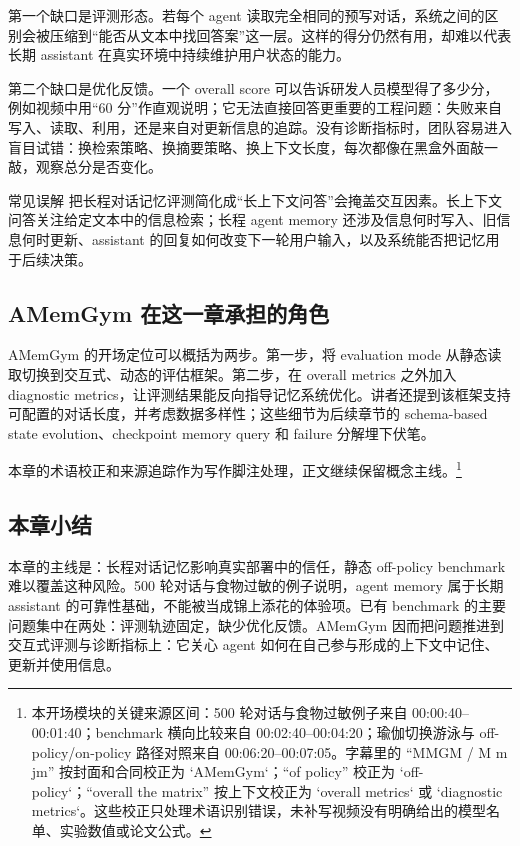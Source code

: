 第一个缺口是评测形态。若每个 agent 读取完全相同的预写对话，系统之间的区别会被压缩到“能否从文本中找回答案”这一层。这样的得分仍然有用，却难以代表长期 assistant 在真实环境中持续维护用户状态的能力。

第二个缺口是优化反馈。一个 overall score 可以告诉研发人员模型得了多少分，例如视频中用“60 分”作直观说明；它无法直接回答更重要的工程问题：失败来自写入、读取、利用，还是来自对更新信息的追踪。没有诊断指标时，团队容易进入盲目试错：换检索策略、换摘要策略、换上下文长度，每次都像在黑盒外面敲一敲，观察总分是否变化。

\begin{warningbox}{常见误解}
把长程对话记忆评测简化成“长上下文问答”会掩盖交互因素。长上下文问答关注给定文本中的信息检索；长程 agent memory 还涉及信息何时写入、旧信息何时更新、assistant 的回复如何改变下一轮用户输入，以及系统能否把记忆用于后续决策。
\end{warningbox}

\subsection{AMemGym 在这一章承担的角色}

AMemGym 的开场定位可以概括为两步。第一步，将 evaluation mode 从静态读取切换到交互式、动态的评估框架。第二步，在 overall metrics 之外加入 diagnostic metrics，让评测结果能反向指导记忆系统优化。讲者还提到该框架支持可配置的对话长度，并考虑数据多样性；这些细节为后续章节的 schema-based state evolution、checkpoint memory query 和 failure 分解埋下伏笔。

本章的术语校正和来源追踪作为写作脚注处理，正文继续保留概念主线。\footnote{本开场模块的关键来源区间：500 轮对话与食物过敏例子来自 00:00:40--00:01:40；benchmark 横向比较来自 00:02:40--00:04:20；瑜伽切换游泳与 off-policy/on-policy 路径对照来自 00:06:20--00:07:05。字幕里的 “MMGM / M m jm” 按封面和合同校正为 `AMemGym`；“of policy” 校正为 `off-policy`；“overall the matrix” 按上下文校正为 `overall metrics` 或 `diagnostic metrics`。这些校正只处理术语识别错误，未补写视频没有明确给出的模型名单、实验数值或论文公式。}

\subsection{本章小结}

本章的主线是：长程对话记忆影响真实部署中的信任，静态 off-policy benchmark 难以覆盖这种风险。500 轮对话与食物过敏的例子说明，agent memory 属于长期 assistant 的可靠性基础，不能被当成锦上添花的体验项。已有 benchmark 的主要问题集中在两处：评测轨迹固定，缺少优化反馈。AMemGym 因而把问题推进到交互式评测与诊断指标上：它关心 agent 如何在自己参与形成的上下文中记住、更新并使用信息。

